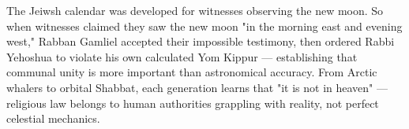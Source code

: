 The Jeiwsh calendar was developed for witnesses observing the new moon. So when witnesses claimed they saw the new moon "in the morning east and evening west," Rabban Gamliel accepted their impossible testimony, then ordered Rabbi Yehoshua to violate his own calculated Yom Kippur — establishing that communal unity is more important than astronomical accuracy. From Arctic whalers to orbital Shabbat, each generation learns that "it is not in heaven" — religious law belongs to human authorities grappling with reality, not perfect celestial mechanics.